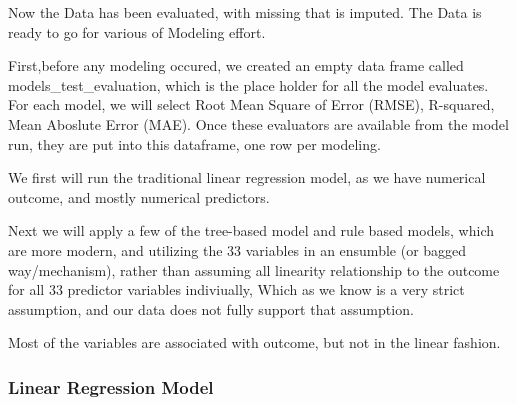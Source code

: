 \documentclass[]{article}
\begin{document}
Now the Data has been evaluated, with missing that is imputed. The Data
is ready to go for various of Modeling effort.

First,before any modeling occured, we created an empty data frame called
models\_test\_evaluation, which is the place holder for all the model
evaluates. For each model, we will select Root Mean Square of Error
(RMSE), R-squared, Mean Aboslute Error (MAE). Once these evaluators are
available from the model run, they are put into this dataframe, one row
per modeling.

We first will run the traditional linear regression model, as we have
numerical outcome, and mostly numerical predictors.

Next we will apply a few of the tree-based model and rule based models,
which are more modern, and utilizing the 33 variables in an ensumble (or
bagged way/mechanism), rather than assuming all linearity relationship
to the outcome for all 33 predictor variables indiviually, Which as we
know is a very strict assumption, and our data does not fully support
that assumption.

Most of the variables are associated with outcome, but not in the linear
fashion.

\subsubsection{Linear Regression Model}\label{linear-regression-model}
\end{document}
